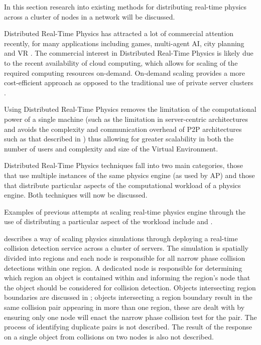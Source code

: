 In this section research into existing methods for distributing real-time physics across a cluster of nodes in a network will be discussed.

Distributed Real-Time Physics has attracted a lot of commercial attention recently, for many applications including games, multi-agent AI, city planning and VR \cite{SpatialOS}. The commercial interest in Distributed Real-Time Physics is likely due to the recent availability of cloud computing, which allows for scaling of the required computing resources on-demand. On-demand scaling provides a more cost-efficient approach as opposed to the traditional use of private server clusters \cite{On-DemandResourceMMOGs}.

Using Distributed Real-Time Physics removes the limitation of the computational power of a single machine (such as the limitation in server-centric architectures \cite{ScalabilityforVirtualWorlds} and avoids the complexity and communication overhead of P2P architectures such as that described in \cite{VON}) thus allowing for greater scalability in both the number of users \cite{ScalabilityIssues} and complexity and size of the Virtual Environment. 

Distributed Real-Time Physics techniques fall into two main categories, those that use multiple instances of the same physics engine (as used by AP) and those that distribute particular aspects of the computational workload of a physics engine. Both techniques will now be discussed.

Examples of previous attempts at scaling real-time physics engine through the use of distributing a particular aspect of the workload include \cite{Morgan2005} and \cite{allard2006distributed}.

\cite{Morgan2005} describes a way of scaling physics simulations through deploying a real-time collision detection service across a cluster of servers. The simulation is spatially divided into regions and each node is responsible for all narrow phase collision detections within one region. A dedicated node is responsible for determining which region an object is contained within and informing the region's node that the object should be considered for collision detection.
Objects intersecting region boundaries are discussed in \cite{Morgan2005}; objects intersecting a region boundary result in the same collision pair appearing in more than one region, these are dealt with by ensuring only one node will enact the narrow phase collision test for the pair. The process of identifying duplicate pairs is not described. The result of the response on a single object from collisions on two nodes is also not described.

